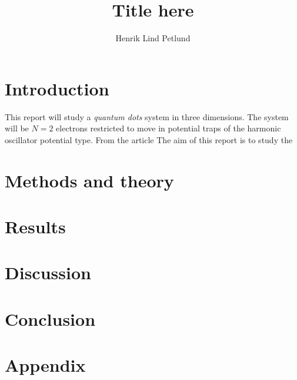 \documentclass[12pt,english,a4paper]{article}
\title{Title here}
\author{Henrik Lind Petlund}
\begin{document}
\begin{titlepage}
\maketitle
\begin{abstract}

\newpage

\end{abstract}
\tableofcontents
\end{titlepage}

\section{Introduction} \label{introduction}

This report will study a \textit{quantum dots} system in three dimensions. The system will be $N=2$ electrons restricted to move in potential traps of the harmonic oscillator potential type. From the article \cite{} The aim of this report is to study the 

\section{Methods and theory} \label{methods_and_theory}

\section{Results} \label{results}

\section{Discussion} \label{discussion}

\section{Conclusion} \label{conclusion}

\section{Appendix} \label{appendix}

\printbibliography
\end{document}
